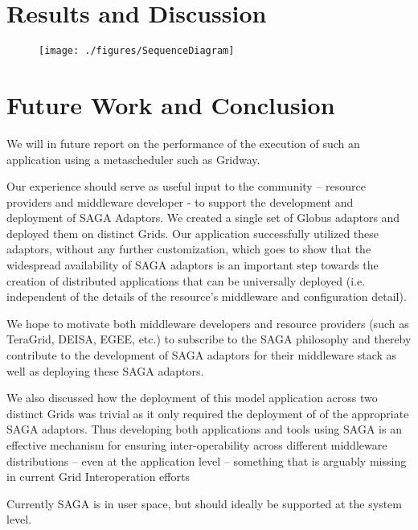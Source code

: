 \documentclass[conference,final]{IEEEtran}
\newcommand{\C}{\comment}
\begin{document}
\section{Results and Discussion}

\begin{figure}
\begin{center}
\texttt{[image: ./figures/SequenceDiagram]}
\end{center}
\caption{ }
\label{fig:boxplot}
\end{figure}

\section{Future Work and Conclusion}

We will in future report on the performance of the execution of such
an application using a metascheduler such as Gridway.

\C{remove focus on adaptor development} Our experience should serve as
useful input to the community -- resource providers and middleware
developer - to support the development and deployment of SAGA
Adaptors.  We created a single set of Globus adaptors and deployed
them on distinct Grids. Our application successfully utilized these
adaptors, without any further customization, which goes to show that
the widespread availability of SAGA adaptors is an important step
towards the creation of distributed applications that can be
universally deployed (i.e.  independent of the details of the
resource's middleware and configuration detail).

We hope to motivate both middleware developers and resource providers
(such as TeraGrid, DEISA, EGEE, etc.) to subscribe to the SAGA
philosophy and thereby contribute to the development of SAGA adaptors
for their middleware stack as well as deploying these SAGA adaptors.

We also discussed how the deployment of this model application across
two distinct Grids was trivial as it only required the deployment of
of the appropriate SAGA adaptors.  Thus developing both applications
and tools using SAGA is an effective mechanism for ensuring
inter-operability across different middleware distributions -- even at
the application level -- something that is arguably missing in current
Grid Interoperation efforts~\cite{gin_paper}

Currently SAGA is in user space, but should ideally be supported at
the system level.
\end{document}
